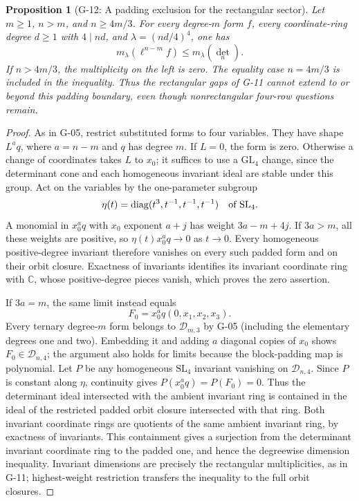 \documentclass[11pt,a4paper]{article}
\newtheorem{proposition}{Proposition}
\theoremstyle{definition}\newtheorem{definition}{Definition}
\begin{document}
\begin{proposition}[G-12: A padding exclusion for the rectangular sector]\label{G-12}
Let $m\geq1$, $n>m$, and $n\geq4m/3$. For every degree-$m$
form $f$, every coordinate-ring degree $d\geq1$ with
$4\mid nd$, and $\lambda=(nd/4)^4$, one has
\begin{equation}\label{G12:exclusion}
 m_\lambda(\ell^{n-m}f)\leq m_\lambda(\det_n).
\end{equation}
If $n>4m/3$, the multiplicity on the left is zero.
The equality case $n=4m/3$ is included in the inequality.
Thus the rectangular gaps of G-11 cannot extend to or beyond
this padding boundary, even though nonrectangular four-row
questions remain.
\end{proposition}
\begin{proof}
As in G-05, restrict substituted forms to four variables.
They have shape $L^a q$, where $a=n-m$ and $q$ has degree
$m$. If $L=0$, the form is zero. Otherwise a change of
coordinates takes $L$ to $x_0$; it suffices to use a
$\mathrm{GL}_4$ change, since the determinant cone and each
homogeneous invariant ideal are stable under this group.
Act on the variables by the one-parameter subgroup
\[
 \eta(t)=\operatorname{diag}(t^3,t^{-1},t^{-1},t^{-1})
 \quad\hbox{of }\mathrm{SL}_4.
\]
A monomial in $x_0^a q$ with $x_0$ exponent $a+j$ has
weight $3a-m+4j$. If $3a>m$, all these weights are positive,
so $\eta(t)x_0^a q\longrightarrow0$ as $t\longrightarrow0$.
Every homogeneous positive-degree invariant therefore
vanishes on every such padded form and on their orbit
closure. Exactness of invariants identifies its invariant
coordinate ring with $\mathbb C$, whose positive-degree pieces vanish,
which proves the zero assertion.

If $3a=m$, the same limit instead equals
\[
 F_0=x_0^a q(0,x_1,x_2,x_3).
\]
Every ternary degree-$m$ form belongs to $\mathcal D_{m,3}$
by G-05 (including the elementary degrees one and two).
Embedding it and adding $a$ diagonal copies of $x_0$
shows $F_0\in\mathcal D_{n,4}$; the argument also holds for
limits because the block-padding map is polynomial.
Let $P$ be any homogeneous $\mathrm{SL}_4$ invariant
vanishing on $\mathcal D_{n,4}$. Since $P$ is constant
along $\eta$, continuity gives
$P(x_0^a q)=P(F_0)=0$. Thus the determinant ideal intersected
with the ambient invariant ring is contained in the ideal
of the restricted padded orbit closure intersected with
that ring. Both invariant coordinate rings are quotients
of the same ambient invariant ring, by exactness of
invariants. This containment gives a surjection from the
determinant invariant coordinate ring to the padded one,
and hence the degreewise dimension inequality.
Invariant dimensions are precisely the rectangular
multiplicities, as in G-11; highest-weight restriction
transfers the inequality to the full orbit closures.
\end{proof}
\end{document}
